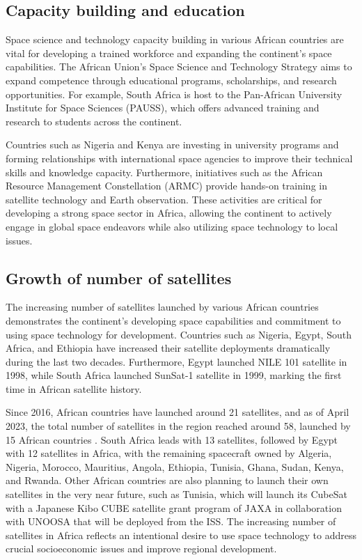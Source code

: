 \documentclass[final,5p,times, twocolumn, sort&compress, sc]{elsarticle}
\begin{document}
\subsection{\textbf{Capacity building and education}}
	Space science and technology capacity building in various African countries are vital for developing a trained workforce and expanding the continent's space capabilities. The African Union's Space Science and Technology Strategy aims to expand competence through educational programs, scholarships, and research opportunities. For example, South Africa is host to the Pan-African University Institute for Space Sciences (PAUSS), which offers advanced training and research to students across the continent. 
	
	Countries such as Nigeria and Kenya are investing in university programs and forming relationships with international space agencies to improve their technical skills and knowledge capacity.  Furthermore, initiatives such as the African Resource Management Constellation (ARMC) provide hands-on training in satellite technology and Earth observation. These activities are critical for developing a strong space sector in Africa, allowing the continent to actively engage in global space endeavors while also utilizing space technology to local issues.
\subsection{\textbf{Growth of number of satellites}}
	The increasing number of satellites launched by various African countries demonstrates the continent's developing space capabilities and commitment to using space technology for development. Countries such as Nigeria, Egypt, South Africa, and Ethiopia have increased their satellite deployments dramatically during the last two decades. Furthermore, Egypt launched NILE 101 satellite in 1998, while South Africa launched SunSat-1 satellite in 1999, marking the first time in African satellite history. 
	
	Since 2016, African countries have launched around 21 satellites, and as of April 2023, the total number of satellites in the region reached around 58, launched by 15 African countries \cite{sa2023}. South Africa leads with 13 satellites, followed by Egypt with 12 satellites in Africa, with the remaining spacecraft owned by Algeria, Nigeria, Morocco, Mauritius, Angola, Ethiopia, Tunisia, Ghana, Sudan, Kenya, and Rwanda. Other African countries are also planning to launch their own satellites in the very near future, such as Tunisia, which will launch its CubeSat with a Japanese Kibo CUBE satellite grant program of JAXA in collaboration with UNOOSA that will be deployed from the ISS. The increasing number of satellites in Africa reflects an intentional desire to use space technology to address crucial socioeconomic issues and improve regional development.
\end{document}
